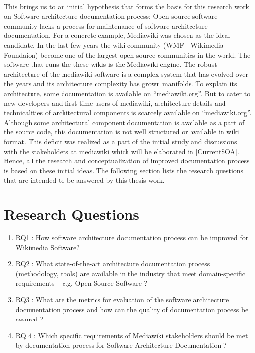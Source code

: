 \\\indent This brings us to an initial hypothesis that forms the basis for this research work on Software architecture documentation process: Open source software community lacks a process for maintenance of software architecture documentation. 
For a concrete example, Mediawiki was chosen as the ideal candidate. In the last few years the wiki community (WMF - Wikimedia Foundaion) become one of the largest open source communities in the world. The software that runs the these wikis is the Mediawiki engine. The robust architecture of the mediawiki software is a complex system that has evolved over the years and its architecture complexity has grown manifolds. To explain its architecture, some documentation is available on “mediawiki.org”. But to cater to new developers and first time users of mediawiki, architecture details and technicalities of architectural components is scarcely available on “mediawiki.org”. Although some architectural component documentation is available as a part of the source code, this documentation is not well structured or available in wiki format. This deficit was realized as a part of the initial study and discussions with the stakeholders at mediawiki which will be elaborated in \autoref{CurrentSOA}. Hence, all the research and conceptualization of improved documentation process is based on these initial ideas. The following section lists the research questions that are intended to be answered by this thesis work.

\section{Research Questions}
\begin{enumerate}
\item RQ1\label{RQ1}  : How software architecture documentation process can be improved for Wikimedia Software?
\item RQ2\label{RQ2} : What state-of-the-art architecture documentation process (methodology, tools) are available in the industry that meet domain-specific requirements – e.g. Open Source Software ?
\item RQ3\label{RQ3} : What are the metrics for evaluation of the software architecture documentation process and how can the quality of documentation process be assured ?
\item RQ 4\label{RQ4} : Which specific requirements of Mediawiki stakeholders should be met by documentation process for Software Architecture Documentation ?
\end{enumerate}

